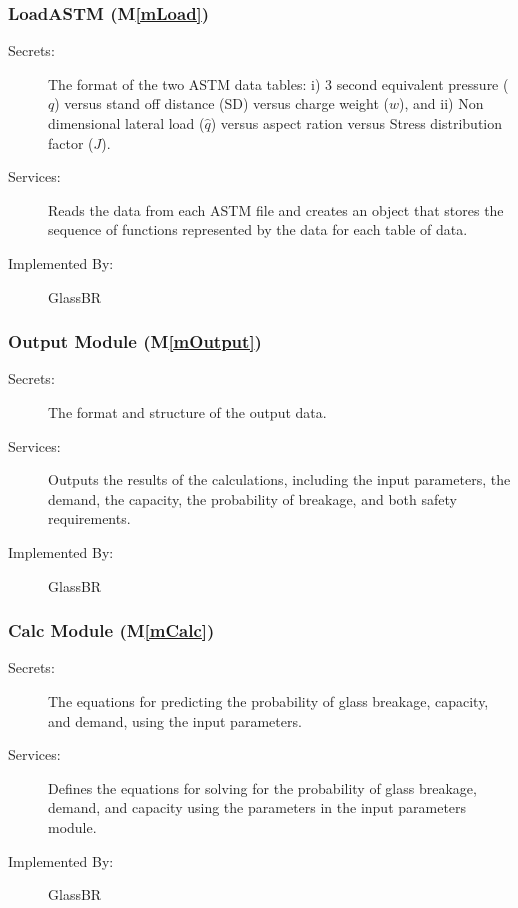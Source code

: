 \documentclass[12pt]{article}
\newcommand{\mref}[1]{M\ref{#1}}
\newcommand{\progname}{GlassBR}
\begin{document}
\subsubsection{LoadASTM (\mref{mLoad})}

\begin{description}
\item[Secrets:] The format of the two ASTM data tables: i) 3 second equivalent
  pressure ($q$) versus stand off distance (SD) versus charge weight ($w$), and
  ii) Non dimensional lateral load ($\hat q$) versus aspect ration versus Stress
  distribution factor ($J$).
\item[Services:] Reads the data from each ASTM file and creates an object that
  stores the sequence of functions represented by the data for each table of
  data.\\
\item[Implemented By:] \progname{}
\end{description}

\subsubsection{Output Module (\mref{mOutput})}

\begin{description}
\item[Secrets:] The format and structure of the output data.
\item[Services:] Outputs the results of the calculations, including the input
  parameters, the demand, the capacity, the probability of breakage, and both 
  safety requirements.
\item[Implemented By:] \progname{}
\end{description} 

\subsubsection{Calc Module (\mref{mCalc})}

\begin{description}
\item[Secrets:] The equations for predicting the probability of glass 
breakage, capacity, and demand, using the input parameters.
\item[Services:] Defines the equations for solving for the probability of glass 
breakage, demand, and capacity using the parameters in the input parameters 
module.
\item[Implemented By:] \progname{}
\end{description} 
 
\end{document}
